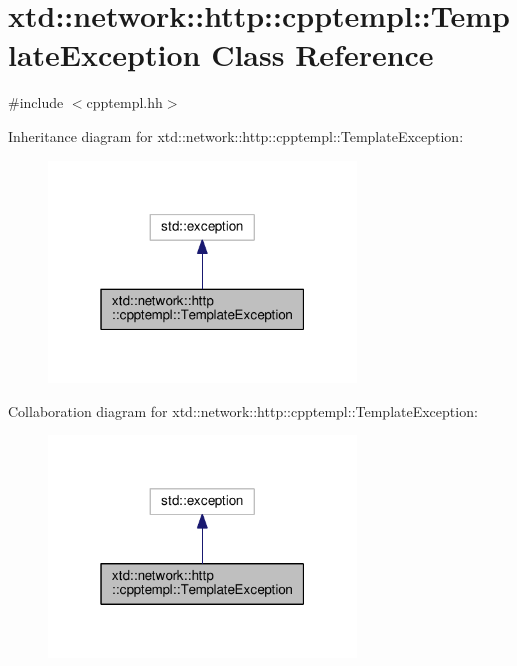 \hypertarget{classxtd_1_1network_1_1http_1_1cpptempl_1_1TemplateException}{}\section{xtd\+:\+:network\+:\+:http\+:\+:cpptempl\+:\+:Template\+Exception Class Reference}
\label{classxtd_1_1network_1_1http_1_1cpptempl_1_1TemplateException}


{\ttfamily \#include $<$cpptempl.\+hh$>$}



Inheritance diagram for xtd\+:\+:network\+:\+:http\+:\+:cpptempl\+:\+:Template\+Exception\+:
\nopagebreak
\begin{figure}[H]
\begin{center}
\leavevmode
\includegraphics[width=232pt]{classxtd_1_1network_1_1http_1_1cpptempl_1_1TemplateException__inherit__graph}
\end{center}
\end{figure}


Collaboration diagram for xtd\+:\+:network\+:\+:http\+:\+:cpptempl\+:\+:Template\+Exception\+:
\nopagebreak
\begin{figure}[H]
\begin{center}
\leavevmode
\includegraphics[width=232pt]{classxtd_1_1network_1_1http_1_1cpptempl_1_1TemplateException__coll__graph}
\end{center}
\end{figure}
